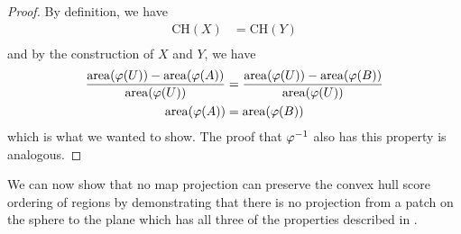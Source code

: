 \begin{proof}
By definition, we have
\begin{align*}
\mathrm{CH}(X) &= \mathrm{CH}(Y)\\
\end{align*}
and by the construction of $X$ and $Y$, we have 
\begin{align*}
\frac{\mathrm{area}(\varphi(U)) - \mathrm{area}(\varphi(A))}{\mathrm{area}(\varphi(U))} &= \frac{\mathrm{area}(\varphi(U)) - \mathrm{area}(\varphi(B))}{\mathrm{area}(\varphi(U))}\\
\mathrm{area}(\varphi(A)) &= \mathrm{area}(\varphi(B))
\end{align*}
 which is what we wanted to show.  The proof that $\varphi^{-1}$ also has this property is analogous.

\end{proof}

We can now show that no map projection can preserve the convex hull score ordering of regions by demonstrating that there is no projection from a patch on the sphere to the plane which has all three of the properties described  in . 


